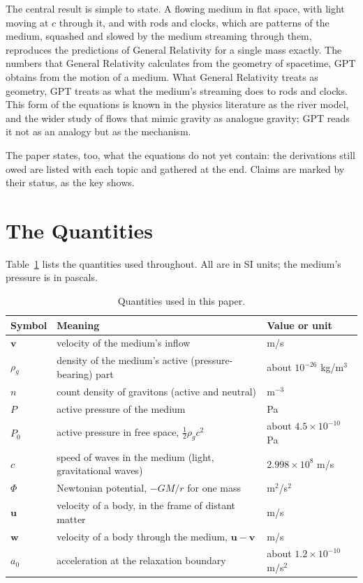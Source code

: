 \documentclass[11pt,a4paper]{article}
\begin{document}
The central result is simple to state. A flowing medium in flat space, with light moving at $c$ through it, and with rods and clocks, which are patterns of the medium, squashed and slowed by the medium streaming through them, reproduces the predictions of General Relativity for a single mass exactly. The numbers that General Relativity calculates from the geometry of spacetime, GPT obtains from the motion of a medium. What General Relativity treats as geometry, GPT treats as what the medium's streaming does to rods and clocks. This form of the equations is known in the physics literature as the river model, and the wider study of flows that mimic gravity as analogue gravity; GPT reads it not as an analogy but as the mechanism.

The paper states, too, what the equations do not yet contain: the derivations still owed are listed with each topic and gathered at the end. Claims are marked by their status, as the key shows.

\statuskey

\section{The Quantities}
\label{sec:quantities}

Table~\ref{tab:symbols} lists the quantities used throughout. All are in SI units; the medium's pressure is in pascals.

\begin{table}[tb]
\centering
\small
\renewcommand{\arraystretch}{1.2}
\begin{tabular}{@{}>{\raggedright\arraybackslash}p{}>{\raggedright\arraybackslash}p{}>{\raggedright\arraybackslash}p{}@{}}
\toprule
\textbf{Symbol} & \textbf{Meaning} & \textbf{Value or unit} \\
\midrule
$\mathbf{v}$ & velocity of the medium's inflow & m/s \\
$\rho_g$ & density of the medium's active (pressure-bearing) part & about $10^{-26}$ kg/m$^3$ \\
$n$ & count density of gravitons (active and neutral) & m$^{-3}$ \\
$P$ & active pressure of the medium & Pa \\
$P_0$ & active pressure in free space, $\tfrac12\rho_g c^2$ & about $4.5\times10^{-10}$ Pa \\
$c$ & speed of waves in the medium (light, gravitational waves) & $2.998\times10^{8}$ m/s \\
$\Phi$ & Newtonian potential, $-GM/r$ for one mass & m$^2$/s$^2$ \\
$\mathbf{u}$ & velocity of a body, in the frame of distant matter & m/s \\
$\mathbf{w}$ & velocity of a body through the medium, $\mathbf{u}-\mathbf{v}$ & m/s \\
$a_0$ & acceleration at the relaxation boundary & about $1.2\times10^{-10}$ m/s$^2$ \\
\bottomrule
\end{tabular}
\caption{Quantities used in this paper.}
\label{tab:symbols}
\end{table}
\end{document}
